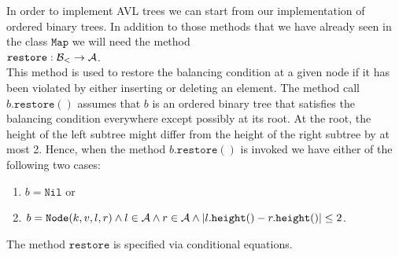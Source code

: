 In order to implement AVL trees we can start from our implementation of ordered binary trees.
In addition to those methods that we have already seen in the class $\mathtt{Map}$ we will need the method
\\[0.2cm]
\hspace*{1.3cm} $\mathtt{restore}: \mathcal{B}_< \rightarrow \mathcal{A}$. 
\\[0.2cm]
This method is used to restore the balancing condition at a given node if it has been violated by
either inserting or deleting an element.
The method call $b.\mathtt{restore}()$ assumes that  $b$ is an ordered binary tree that satisfies
the balancing condition everywhere except possibly at its root. 
At the root, the height of the left subtree might differ from the height of the right subtree by at
most 2.  Hence, when the method $b.\mathtt{restore}()$ is invoked we have either of the following
two cases:
\begin{enumerate}
\item $b = \mathtt{Nil}$ \quad or
\item $b = \mathtt{Node}(k,v,l,r) \wedge l \in \mathcal{A} \wedge r \in \mathcal{A} \wedge
       |l.\mathtt{height}() - r.\mathtt{height}()| \leq 2$.
\end{enumerate}
The method $\mathtt{restore}$ is specified via conditional equations.
